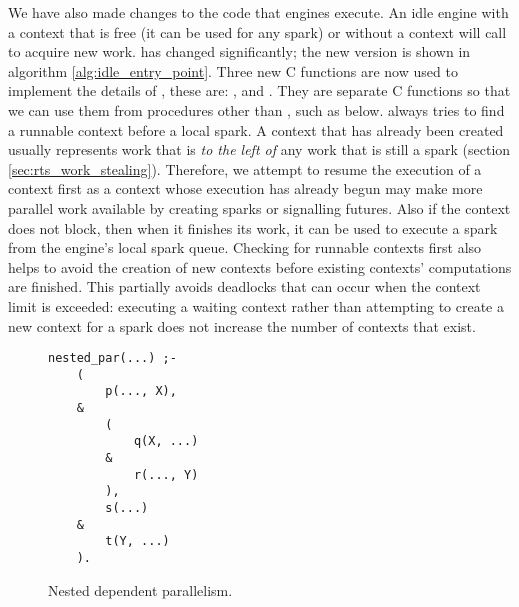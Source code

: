We have also made changes to the code that \idle engines execute.
An idle engine with a context that is free (it can be used for any spark) or
without a context will call \idle to acquire new work.
\idle has changed significantly;
the new version is shown in algorithm \ref{alg:idle_entry_point}.
Three new C functions are now used to implement the details of \idle, these
are:
\tryruncontext, \tryrunlocalspark and \trystealspark.
They are separate C functions so that we can use them from procedures other
than \idle, such as \joinandcontinue below.
\idle always tries to find a runnable context before a local spark.
A context that has already been created usually represents work that is
\emph{to the left of}
any work that is still a spark (section \ref{sec:rts_work_stealing}).
Therefore, we attempt to resume the execution of a context first
as a context whose execution has already begun
may make more parallel work available by creating sparks or signalling
futures.
Also if the context does not block, then when it finishes its work,
it can be used to execute a spark from the engine's local spark queue.
Checking for runnable contexts first also helps to avoid the creation of new
contexts before existing contexts' computations are finished.
This partially avoids deadlocks that can occur when the context limit is
exceeded:
executing a waiting context rather than attempting to create a new context
for a spark does not increase the number of contexts that exist.

\begin{figure}
\begin{center}
\begin{verbatim}
nested_par(...) ;-
    (
        p(..., X),
    &
        (
            q(X, ...)
        & 
            r(..., Y)
        ),
        s(...)
    &
        t(Y, ...)
    ).
\end{verbatim}
\end{center}
\caption{Nested dependent parallelism.}
\label{fig:nested_dep_par}
\end{figure}

